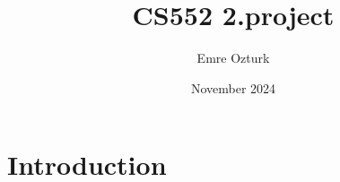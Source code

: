 \documentclass{article}
\title{CS552 2.project}
\author{Emre Ozturk}
\date{November 2024}
\begin{document}
\maketitle

\section{Introduction}
\end{document}
